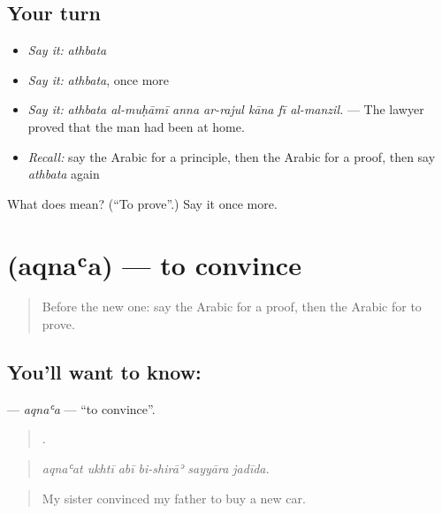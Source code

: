 \subsection*{Your turn}
\begin{itemize}
\raggedright
  \item \emph{Say it:} \emph{athbata}
  \item \emph{Say it:} \emph{athbata}, once more
  \item \emph{Say it:} \emph{athbata al-muḥāmī anna ar-rajul kāna fī al-manzil.} — The lawyer proved that the man had been at home.
  \item \emph{Recall:} say the Arabic for a principle, then the Arabic for a proof, then say \emph{athbata} again
\end{itemize}

\begin{tcolorbox}[breakable,colback=teal!4,colframe=teal!35!black,title={Before you move on}]
What does  mean? (\textquotedblleft{}To prove\textquotedblright{}.) Say it once more.
\end{tcolorbox}
\section[\texorpdfstring{\ar{أقنع} (aqnaʿa)}{أقنع (aqnaʿa)}]{ (aqnaʿa) — to convince}

\label{lesson:AR-C358-aqnaa}



\begin{quote}
Before the new one: say the Arabic for a proof, then the Arabic for to prove.
\end{quote}

\subsection*{You'll want to know: }
\textbf{} — \emph{aqnaʿa} — \textquotedblleft{}to convince\textquotedblright{}.

\begin{quote}
     .
\end{quote}

\begin{quote}
\emph{aqnaʿat ukhtī abī bi-shirāʾ sayyāra jadīda.}
\end{quote}

\begin{quote}
My sister convinced my father to buy a new car.
\end{quote}

